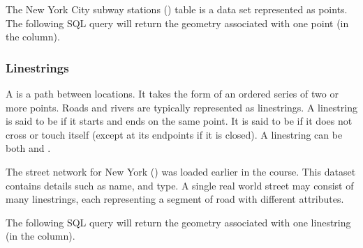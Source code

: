 \documentclass[a4paper,11pt,english]{sphinxmanual}
\begin{document}
The New York City subway stations () table is a data set represented as points. The following SQL query will return the geometry associated with one point (in the  column).

\begin{sphinxVerbatim}[commandchars=\\\{\}]
  
   
   
\end{sphinxVerbatim}


\subsubsection{Linestrings}
\label{\detokenize{basic:linestrings}}

A  is a path between locations.  It takes the form of an ordered series of two or more points.  Roads and rivers are typically represented as linestrings.  A linestring is said to be  if it starts and ends on the same point.  It is said to be  if it does not cross or touch itself (except at its endpoints if it is closed).  A linestring can be both  and .

The street network for New York () was loaded earlier in the course.  This dataset contains details such as name, and type.  A single real world street may consist of many linestrings, each representing a segment of road with different attributes.

The following SQL query will return the geometry associated with one linestring (in the  column).

\begin{sphinxVerbatim}[commandchars=\\\{\}]
 
   
     
\end{sphinxVerbatim}
\end{document}
